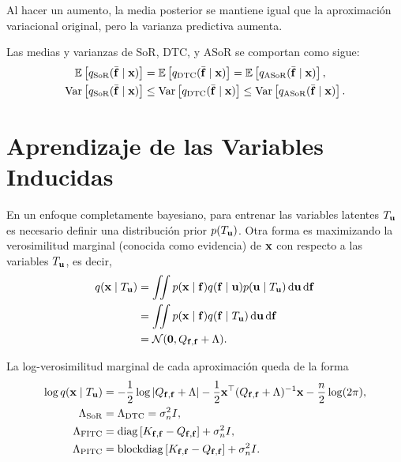 Al hacer un aumento, la media posterior se mantiene igual que la aproximación variacional original, pero la varianza predictiva aumenta.

\begin{proposition}
	Las medias y varianzas de SoR, DTC, y ASoR se comportan como sigue:
	\begin{align*}
		\mathbb{E}\left[q_{\mathrm{SoR}}(\bar{\mathbf{f}} \mid \mathbf{x}) \right]		&= \mathbb{E} \left[q_{\mathrm{DTC}}(\bar{\mathbf{f}} \mid \mathbf{x}) \right] = \mathbb{E}\left[q_{\mathrm{ASoR}}(\bar{\mathbf{f}} \mid \mathbf{x}) \right],\\
		\operatorname{Var}\left[q_{\mathrm{SoR}}(\bar{\mathbf{f}} \mid \mathbf{x}) \right]	&\leq \operatorname{Var}\left[q_{\mathrm{DTC}}(\bar{\mathbf{f}} \mid \mathbf{x}) \right] \leq \operatorname{Var}\left[q_{\mathrm{ASoR}}(\bar{\mathbf{f}} \mid \mathbf{x}) \right].
	\end{align*}
\end{proposition}

\section{Aprendizaje de las Variables Inducidas}

En un enfoque completamente bayesiano, para entrenar las variables latentes \(T_{\mathbf{u}}\) es necesario definir una distribución prior \(p(T_{\mathbf{u}})\). Otra forma es maximizando la verosimilitud marginal (conocida como evidencia) de \(\mathbf{x}\) con respecto a las variables \(T_{\mathbf{u}}\), es decir,
\begin{align*}
	q(\mathbf{x} \mid T_{\mathbf{u}})	&= \iint p(\mathbf{x} \mid \mathbf{f}) q(\mathbf{f} \mid \mathbf{u}) p(\mathbf{u} \mid T_{\mathbf{u}}) \dd{\mathbf{u}} \dd{\mathbf{f}} \\
							&= \iint p(\mathbf{x} \mid \mathbf{f}) q(\mathbf{f} \mid T_{\mathbf{u}}) \dd{\mathbf{u}} \dd{\mathbf{f}} \\
							&= \mathcal{N}(\mathbf{0}, Q_{\mathbf{f}, \mathbf{f}} + \Lambda).
\end{align*}

\begin{proposition}
	La log-verosimilitud marginal de cada aproximación queda de la forma
	\begin{align*}
		\log q(\mathbf{x} \mid T_{\mathbf{u}})	&= -\frac{1}{2} \log \vert Q_{\mathbf{f}, \mathbf{f}} + \Lambda \vert - \frac{1}{2} \mathbf{x}^{\top} (Q_{\mathbf{f}, \mathbf{f}} + \Lambda)^{-1} \mathbf{x} - \frac{n}{2} \log(2\pi), \\
		\Lambda_{\mathrm{SoR}}		&= \Lambda_{\mathrm{DTC}} = \sigma_n^2 I, \\
		\Lambda_{\mathrm{FITC}}		&= \operatorname{diag}\left[K_{\mathbf{f}, \mathbf{f}} - Q_{\mathbf{f}, \mathbf{f}}\right] + \sigma_n^2 I, \\
		\Lambda_{\mathrm{PITC}}		&= \operatorname{blockdiag}\left[K_{\mathbf{f}, \mathbf{f}} - Q_{\mathbf{f}, \mathbf{f}}\right] + \sigma_n^2 I.
	\end{align*}
\end{proposition}

